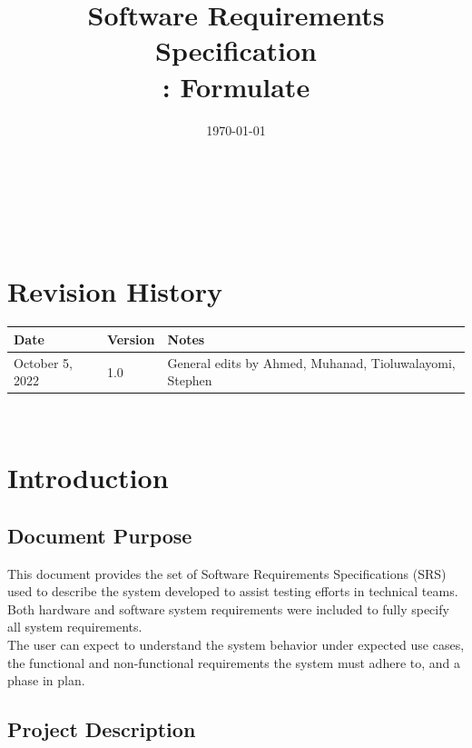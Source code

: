 \documentclass[12pt]{article}
\begin{document}
\title{Software Requirements Specification \\ \progname: Formulate} 

\author{\authname}
\date{\today}
	
\maketitle

~\newpage


\tableofcontents

~\newpage

\section*{Revision History}

\begin{tabularx}{\textwidth}{p{3cm}p{2cm}X}
\toprule {\bf Date} & {\bf Version} & {\bf Notes}\\
\midrule
October 5, 2022 & 1.0 & General edits by Ahmed, Muhanad, Tioluwalayomi, Stephen\\
\bottomrule
\end{tabularx}

~\newpage

\section{Introduction}

\subsection{Document Purpose}

This document provides the set of Software Requirements Specifications (SRS) used to describe the system developed to assist testing efforts in technical teams. Both hardware and software system requirements were included to fully specify all system requirements. \\

The user can expect to understand the system behavior under expected use cases, the functional and non-functional requirements the system must adhere to, and a phase in plan.\\

\subsection{Project Description}
\end{document}
